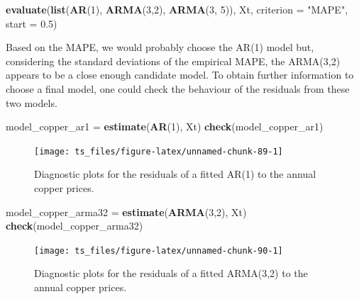 \documentclass[]{book}
\newenvironment{Shaded}{\begin{snugshade}}{\end{snugshade}}
\newcommand{\KeywordTok}[1]{\textcolor[rgb]{0.13,0.29,0.53}{\textbf{#1}}}
\newcommand{\DataTypeTok}[1]{\textcolor[rgb]{0.13,0.29,0.53}{#1}}
\newcommand{\DecValTok}[1]{\textcolor[rgb]{0.00,0.00,0.81}{#1}}
\newcommand{\FloatTok}[1]{\textcolor[rgb]{0.00,0.00,0.81}{#1}}
\newcommand{\StringTok}[1]{\textcolor[rgb]{0.31,0.60,0.02}{#1}}
\newcommand{\NormalTok}[1]{#1}
\theoremstyle{definition}
\theoremstyle{definition}
\theoremstyle{definition}
\theoremstyle{remark}
\begin{document}
\begin{Shaded}
\begin{Highlighting}[]
\KeywordTok{evaluate}\NormalTok{(}\KeywordTok{list}\NormalTok{(}\KeywordTok{AR}\NormalTok{(}\DecValTok{1}\NormalTok{), }\KeywordTok{ARMA}\NormalTok{(}\DecValTok{3}\NormalTok{,}\DecValTok{2}\NormalTok{), }\KeywordTok{ARMA}\NormalTok{(}\DecValTok{3}\NormalTok{, }\DecValTok{5}\NormalTok{)), Xt, }\DataTypeTok{criterion =} \StringTok{"MAPE"}\NormalTok{, }\DataTypeTok{start =} \FloatTok{0.5}\NormalTok{)}
\end{Highlighting}
\end{Shaded}

Based on the MAPE, we would probably choose the AR(1) model but,
considering the standard deviations of the empirical MAPE, the ARMA(3,2)
appears to be a close enough candidate model. To obtain further
information to choose a final model, one could check the behaviour of
the residuals from these two models.

\begin{Shaded}
\begin{Highlighting}[]
\NormalTok{model_copper_ar1 =}\StringTok{ }\KeywordTok{estimate}\NormalTok{(}\KeywordTok{AR}\NormalTok{(}\DecValTok{1}\NormalTok{), Xt)}
\KeywordTok{check}\NormalTok{(model_copper_ar1)}
\end{Highlighting}
\end{Shaded}

\begin{figure}

{\centering \texttt{[image: ts\_files/figure-latex/unnamed-chunk-89-1]} 

}

\caption{Diagnostic plots for the residuals of a fitted AR(1) to the annual copper prices.}\label{fig:unnamed-chunk-89}
\end{figure}

\begin{Shaded}
\begin{Highlighting}[]
\NormalTok{model_copper_arma32 =}\StringTok{ }\KeywordTok{estimate}\NormalTok{(}\KeywordTok{ARMA}\NormalTok{(}\DecValTok{3}\NormalTok{,}\DecValTok{2}\NormalTok{), Xt)}
\KeywordTok{check}\NormalTok{(model_copper_arma32)}
\end{Highlighting}
\end{Shaded}

\begin{figure}

{\centering \texttt{[image: ts\_files/figure-latex/unnamed-chunk-90-1]} 

}

\caption{Diagnostic plots for the residuals of a fitted ARMA(3,2) to the annual copper prices.}\label{fig:unnamed-chunk-90}
\end{figure}
\end{document}

